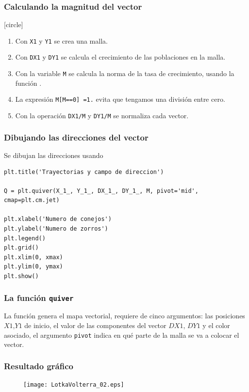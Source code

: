 \begin{frame}[fragile]
\frametitle{Calculando la magnitud del vector}
[circle]
\begin{enumerate}[<+->]
\item Con \texttt{X1} y \texttt{Y1} se crea una malla. 
\item Con \texttt{DX1} y \texttt{DY1} se calcula el crecimiento de las poblaciones en la malla.
\item Con la variable \texttt{M} se calcula la norma de la tasa de crecimiento, usando la función .
\item La expresión \texttt{M[M==0] =1.} evita que tengamos una división entre cero.
\item Con la operación \texttt{DX1/M} y \texttt{DY1/M} se normaliza cada vector.
\end{enumerate}
\end{frame}
\begin{frame}
\frametitle{Dibujando las direcciones del vector}
Se dibujan las direcciones usando 
\begin{lstlisting}[caption=Dibujando las direcciones del vector resultante, style=FormattedNumber, basicstyle=\linespread{1.1}\ttfamily=\small, columns=fullflexible]
plt.title('Trayectorias y campo de direccion')

Q = plt.quiver(X_1_, Y_1_, DX_1_, DY_1_, M, pivot='mid', cmap=plt.cm.jet)

plt.xlabel('Numero de conejos')
plt.ylabel('Numero de zorros')
plt.legend()
plt.grid()
plt.xlim(0, xmax)
plt.ylim(0, ymax)
plt.show()
\end{lstlisting}
\end{frame}
\begin{frame}[fragile]
\frametitle{La función \texttt{quiver}} 
La función  genera el mapa vectorial, requiere de cinco argumentos: las posiciones $X1$,$Y1$ de inicio, el valor de las componentes del vector $DX1$, $DY1$ y el color asociado, el argumento \texttt{pivot} indica en qué parte de la malla se va a colocar el vector.
\end{frame}
\begin{frame}[plain]
\frametitle{Resultado gráfico}
\begin{figure}
    \centering
    \texttt{[image: LotkaVolterra\_02.eps]} 
\end{figure}
\end{frame}

